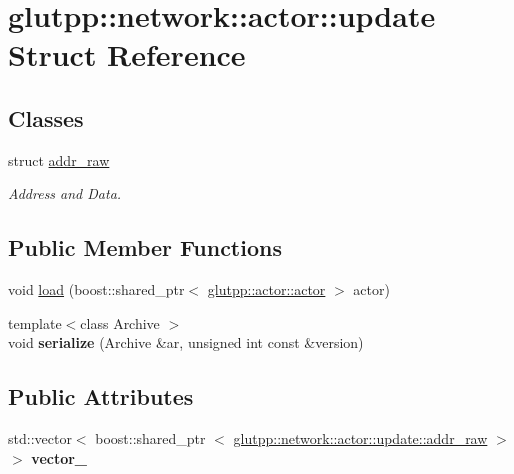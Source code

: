\hypertarget{structglutpp_1_1network_1_1actor_1_1update}{\section{glutpp\-:\-:network\-:\-:actor\-:\-:update \-Struct \-Reference}
\label{structglutpp_1_1network_1_1actor_1_1update}
}
\subsection*{\-Classes}
\begin{DoxyCompactItemize}
\item 
struct \hyperlink{structglutpp_1_1network_1_1actor_1_1update_1_1addr__raw}{addr\-\_\-raw}
\begin{DoxyCompactList}\small\item\em \-Address and \-Data. \end{DoxyCompactList}\end{DoxyCompactItemize}
\subsection*{\-Public \-Member \-Functions}
\begin{DoxyCompactItemize}
\item 
void \hyperlink{structglutpp_1_1network_1_1actor_1_1update_a1bd07663519737a80df43482d8569a93}{load} (boost\-::shared\-\_\-ptr$<$ \hyperlink{classglutpp_1_1actor_1_1actor}{glutpp\-::actor\-::actor} $>$ actor)
\item 
\hypertarget{structglutpp_1_1network_1_1actor_1_1update_ac937da16db2ce2dd15988cbd00841286}{{\footnotesize template$<$class Archive $>$ }\\void {\bfseries serialize} (\-Archive \&ar, unsigned int const \&version)}\label{structglutpp_1_1network_1_1actor_1_1update_ac937da16db2ce2dd15988cbd00841286}

\end{DoxyCompactItemize}
\subsection*{\-Public \-Attributes}
\begin{DoxyCompactItemize}
\item 
\hypertarget{structglutpp_1_1network_1_1actor_1_1update_a178e81960ce2ad6fe2cf7b0668afd835}{std\-::vector$<$ boost\-::shared\-\_\-ptr\*
$<$ \hyperlink{structglutpp_1_1network_1_1actor_1_1update_1_1addr__raw}{glutpp\-::network\-::actor\-::update\-::addr\-\_\-raw} $>$ $>$ {\bfseries vector\-\_\-}}\label{structglutpp_1_1network_1_1actor_1_1update_a178e81960ce2ad6fe2cf7b0668afd835}

\end{DoxyCompactItemize}


